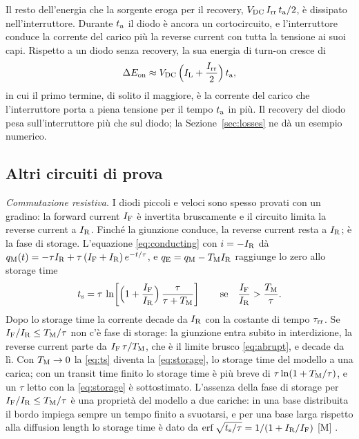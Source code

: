 \documentclass[10pt,a4paper]{scrartcl}
\let\newcommand\pdvaluedefine
\newcommand{\IF}{I_\mathrm{F}}
\newcommand{\IR}{I_\mathrm{R}}
\newcommand{\Irr}{I_\mathrm{rr}}
\newcommand{\ta}{t_\mathrm{a}}
\newcommand{\ts}{t_\mathrm{s}}
\newcommand{\taurr}{\tau_\mathrm{rr}}
\newcommand{\TM}{T_\mathrm{M}}
\newcommand{\qE}{q_\mathrm{E}}
\newcommand{\qM}{q_\mathrm{M}}
\newcommand{\Vdc}{V_\mathrm{DC}}
\begin{document}
Il resto dell'energia che la sorgente eroga per il recovery, $\Vdc\,\Irr\,\ta/2$, è dissipato nell'interruttore. Durante $\ta$ il diodo è ancora un cortocircuito, e l'interruttore conduce la corrente del carico più la reverse current con tutta la tensione ai suoi capi. Rispetto a un diodo senza recovery, la sua energia di turn-on cresce di
\begin{equation}
\Delta E_\mathrm{on} \approx \Vdc\,\Bigl(I_\mathrm{L} + \frac{\Irr}{2}\Bigr)\,\ta ,
\label{eq:eon}
\end{equation}
in cui il primo termine, di solito il maggiore, è la corrente del carico che l'interruttore porta a piena tensione per il tempo $\ta$ in più. Il recovery del diodo pesa sull'interruttore più che sul diodo; la Sezione~\ref{sec:losses} ne dà un esempio numerico.
\subsection{Altri circuiti di prova}
\label{sec:othertests}
\emph{Commutazione resistiva.} I diodi piccoli e veloci sono spesso provati con un gradino: la forward current $\IF$ è invertita bruscamente e il circuito limita la reverse current a $\IR$. Finché la giunzione conduce, la reverse current resta a $\IR$; è la fase di storage. L'equazione \eqref{eq:conducting} con $i = -\IR$ dà $\qM(t) = -\tau\IR + \tau\,(\IF+\IR)\,e^{-t/\tau}$, e $\qE = \qM - \TM\IR$ raggiunge lo zero allo storage time
\begin{equation}
\ts = \tau\,\ln\!\left[\Bigl(1+\frac{\IF}{\IR}\Bigr)\,\frac{\tau}{\tau+\TM}\right] \qquad \text{se} \quad \frac{\IF}{\IR} > \frac{\TM}{\tau} .
\label{eq:ts}
\end{equation}
Dopo lo storage time la corrente decade da $\IR$ con la costante di tempo $\taurr$. Se $\IF/\IR \leq \TM/\tau$ non c'è fase di storage: la giunzione entra subito in interdizione, la reverse current parte da $\IF\,\tau/\TM$, che è il limite brusco \eqref{eq:abrupt}, e decade da lì. Con $\TM \to 0$ la \eqref{eq:ts} diventa la \eqref{eq:storage}, lo storage time del modello a una carica; con un transit time finito lo storage time è più breve di $\tau\ln(1+\TM/\tau)$, e un $\tau$ letto con la \eqref{eq:storage} è sottostimato. L'assenza della fase di storage per $\IF/\IR \leq \TM/\tau$ è una proprietà del modello a due cariche: in una base distribuita il bordo impiega sempre un tempo finito a svuotarsi, e per una base larga rispetto alla diffusion length lo storage time è dato da $\operatorname{erf}\sqrt{\ts/\tau} = 1/(1+\IR/\IF)$ [M] \cite{sze}.
\end{document}
